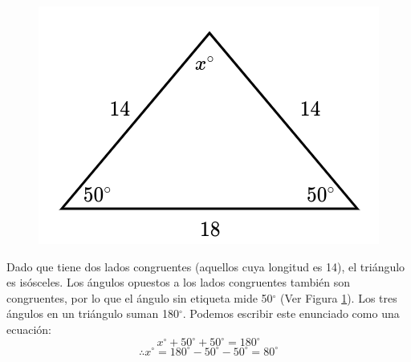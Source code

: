 \begin{minipage}[t][][t]{0.6\textwidth}
    \begin{solutionbox}{8cm}
        \begin{minipage}{0.3\textwidth}
            \begin{figure}[H]
                \centering
                \includegraphics[width=0.9\linewidth]{../images/findangle01a.png}
                \caption{}
                \label{fig:findangle01a}
            \end{figure}
        \end{minipage}\hfill
        \begin{minipage}{0.65\textwidth}
            Dado que tiene dos lados congruentes (aquellos cuya longitud es 14), el triángulo es isósceles. Los ángulos opuestos a los lados congruentes también son congruentes, por lo que el ángulo sin etiqueta mide 50$^\circ$ (Ver Figura \ref{fig:findangle01a}).
            Los tres ángulos en un triángulo suman 180$^\circ$. Podemos escribir este enunciado como una ecuación:
            \[x^\circ + 50^\circ + 50^\circ = 180^\circ \]
            \[\therefore x^\circ = 180^\circ - 50^\circ - 50^\circ = 80^\circ\]
        \end{minipage}
    \end{solutionbox}
\end{minipage}